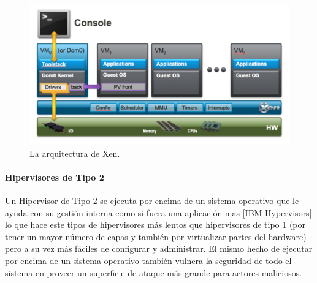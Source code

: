 \begin{figure}
  \begin{center}
      \includegraphics[width=\textwidth]{Figures/arq-xen.png}
  \end{center}
  \caption{La arquitectura de Xen.} 
  \label{arq-xen}
\end{figure}

\paragraph{Hipervisores de Tipo 2}
Un Hipervisor de Tipo 2 se ejecuta por encima de un sistema operativo que le ayuda con su gestión interna como si fuera una aplicación mas [IBM-Hypervisors] lo que hace este tipos de hipervisores más lentos que hipervisores de tipo 1 (por tener un mayor número de capas y también por virtualizar partes del hardware) pero a su vez más fáciles de configurar y administrar. El mismo hecho de ejecutar por encima de un sistema operativo también vulnera la seguridad de todo el sistema en proveer un superficie de ataque más grande para actores maliciosos.

